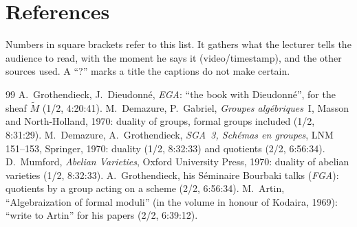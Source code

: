 \documentclass[11pt]{article}
\begin{document}
\section*{References}
\noindent Numbers in square brackets refer to this list. It gathers what the lecturer tells the audience to read, with the moment he says it (video/timestamp), and the other sources used. A ``?'' marks a title the captions do not make certain.
\begingroup\renewcommand{\section}[2]{}\setlength{\itemsep}{1pt}\small
\begin{thebibliography}{99}
 A.~Grothendieck, J.~Dieudonné, \emph{EGA}: ``the book with Dieudonné'', for the sheaf $\widetilde M$ (1/2, 4:20:41).
 M.~Demazure, P.~Gabriel, \emph{Groupes algébriques}~I, Masson and North-Holland, 1970: duality of groups, formal groups included (1/2, 8:31:29).
 M.~Demazure, A.~Grothendieck, \emph{SGA~3, Schémas en groupes}, LNM 151--153, Springer, 1970: duality (1/2, 8:32:33) and quotients (2/2, 6:56:34).
 D.~Mumford, \emph{Abelian Varieties}, Oxford University Press, 1970: duality of abelian varieties (1/2, 8:32:33).
 A.~Grothendieck, his Séminaire Bourbaki talks (\emph{FGA}): quotients by a group acting on a scheme (2/2, 6:56:34).
 M.~Artin, ``Algebraization of formal moduli'' (in the volume in honour of Kodaira, 1969): ``write to Artin'' for his papers (2/2, 6:39:12).
\end{thebibliography}
\endgroup
\end{document}
